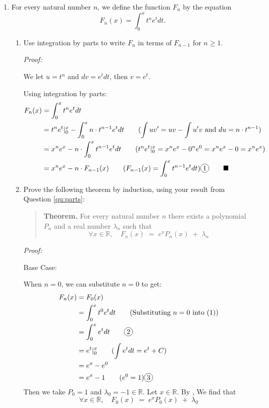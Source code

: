 \documentclass[12pt]{exam}
\newcommand*\circled[1]{\tikz[baseline=(char.base)]{
    \node[shape=circle, draw, inner sep=1pt, 
        minimum height=12pt] (char) {#1};}}
\newcommand{\R}{\mathbb{R}}
\begin{document}
\begin{enumerate}

\item For every natural number $n$, we define the function $F_n$ by the equation
	\begin{equation} \label{eq:Fn}
		F_n(x) = \int_0^x t^n e^t dt.
	\end{equation}
	\begin{enumerate}
		\item \label{qu:parts} Use integration by parts to write $F_{n}$ in terms of $F_{n-1}$ for $n \geq 1$.  
				
				\emph{Proof:}
				
				We let $u=t^n$ and $dv=e^tdt$, then $v=e^t$.
				
				Using integration by parts:
				\begin{align*}
				    F_n(x) &= \int_0^x t^n e^t dt\\
				    &= t^n e^t |_0^x - \int_0^x n\cdot t^{n-1} e^t dt\qquad(\int uv'=uv-\int u'v\mbox{ and }du=n\cdot t^{n-1})\\
				    &= x^ne^x - n \cdot \int_0^x t^{n-1} e^t dt\qquad(t^n e^t |_0^x=x^n e^x - 0^n e^0=x^n e^x - 0=x^n e^x)\\
				    &= x^ne^x - n \cdot F_{n-1}(x)\qquad(F_{n-1}(x)=\int_0^x t^{n-1} e^t dt)\circled{1}\qquad\blacksquare
				\end{align*}
				
				\newpage
				
		\item \label{qu:lemma} Prove the following theorem by induction, using your result from Question \ref{qu:parts}:
			\begin{quotation}
				\noindent
				{\bf Theorem.}  For every natural number $n$ there exists a polynomial $P_n$ and a real number $\lambda_n$ such that										\begin{equation*}
					\forall x \in \R, \quad F_n(x) \;  = \; e^x P_n(x)  \; + \; \lambda_n
				\end{equation*}  
			\end{quotation}
			
			\emph{Proof:}
			
			Base Case:
			
			When $n=0$, we can substitute $n=0$ to get:
			\begin{align*}
			    F_n(x) &= F_0(x) \\
			    &= \int_0^x t^0 e^t dt\qquad(\mbox{Substituting $n=0$ into (1)})\\
			    &= \int_0^x e^t dt\qquad \circled{2}\\
			    &= e^t |_0^x\qquad(\int e^t dt=e^t+C)\\
			    &= e^x - e^0\\
			    &= e^x - 1\qquad(e^0=1)\circled{3}
			\end{align*}
			Then we take $P_0=1$ and $\lambda_0=-1\in\R$. Let $x\in\R$. By \circled{3}, We find that
			$$
			    \forall x \in \R, \quad F_0(x) \;  = \; e^x P_0(x)  \; + \; \lambda_0
			$$
			

\end{enumerate}
\end{enumerate}
\end{document}
